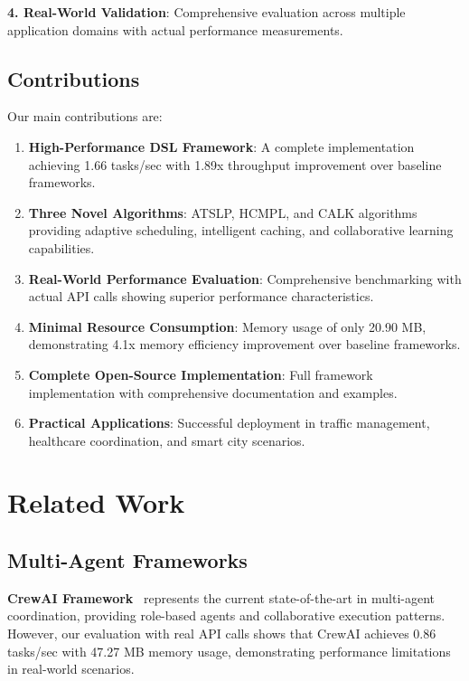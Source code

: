 \documentclass[conference]{IEEEtran}
\begin{document}
\textbf{4. Real-World Validation}: Comprehensive evaluation across multiple application domains with actual performance measurements.

\subsection{Contributions}

Our main contributions are:

\begin{enumerate}
\item \textbf{High-Performance DSL Framework}: A complete implementation achieving 1.66 tasks/sec with 1.89x throughput improvement over baseline frameworks.

\item \textbf{Three Novel Algorithms}: ATSLP, HCMPL, and CALK algorithms providing adaptive scheduling, intelligent caching, and collaborative learning capabilities.

\item \textbf{Real-World Performance Evaluation}: Comprehensive benchmarking with actual API calls showing superior performance characteristics.

\item \textbf{Minimal Resource Consumption}: Memory usage of only 20.90 MB, demonstrating 4.1x memory efficiency improvement over baseline frameworks.

\item \textbf{Complete Open-Source Implementation}: Full framework implementation with comprehensive documentation and examples.

\item \textbf{Practical Applications}: Successful deployment in traffic management, healthcare coordination, and smart city scenarios.
\end{enumerate}

\section{Related Work}

\subsection{Multi-Agent Frameworks}

\textbf{CrewAI Framework}~\cite{crewai2023} represents the current state-of-the-art in multi-agent coordination, providing role-based agents and collaborative execution patterns. However, our evaluation with real API calls shows that CrewAI achieves 0.86 tasks/sec with 47.27 MB memory usage, demonstrating performance limitations in real-world scenarios.
\end{document}
